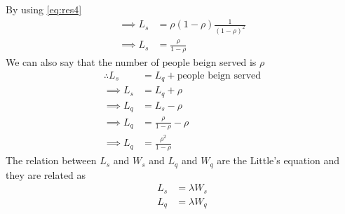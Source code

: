 \documentclass[journal,12pt,twocolumn]{IEEEtran}
\begin{document}
By using \eqref{eq:res4}
\begin{align}
    \implies L_s&=\rho(1-\rho)\frac{1}{(1-\rho)^2}\\
    \implies L_s&=\frac{\rho}{1-\rho}
\end{align}
We can also say that the number of people beign served is $\rho$
\begin{align}
    \therefore L_s&=L_q+\text{people beign served}\\
    \implies L_s&=L_q+\rho\\
    \implies L_q&=L_s-\rho\\
    \implies L_q&=\frac{\rho}{1-\rho}-\rho\\
    \implies L_q&=\frac{\rho^2}{1-\rho}
\end{align}
\newpage
The relation between $L_s$ and $W_s$ and $L_q$ and $W_q$ are the Little's equation and they are related as
\begin{align}
    L_s&=\lambda W_s\\
    L_q&=\lambda W_q
\end{align}
\end{document}
